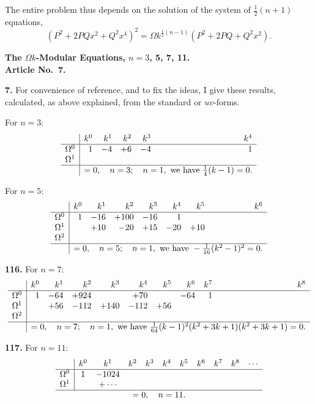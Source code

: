 \documentclass[11pt,a4paper]{article}
\theoremstyle{plain}
\begin{document}
The entire problem thus depends on the solution of the system of $\frac{1}{2}(n + 1)$ equations,
\[
(P^2 + 2PQx^2 + Q^2x^4)^2 = \Omega k^{\frac{1}{2}(n - 1)}(P^2 + 2PQ + Q^2x^2).
\]

\medskip
\noindent\textbf{The $\Omega k$-Modular Equations, $n = 3$, 5, 7, 11.}\\
\textbf{Article No.~7.}

\medskip
\noindent\textbf{7.} For convenience of reference, and to fix the ideas, I give these results, calculated, as above explained, from the standard or $uv$-forms.

For $n = 3$:
\[
\begin{array}{r|rrrrr}
& k^0 & k^1 & k^2 & k^3 & k^4 \\
\hline
\Omega^0 & 1 & -4 & +6 & -4 & 1 \\
\Omega^1 & & & & & \\
\hline
& \multicolumn{5}{c}{= 0, \quad n = 3; \quad n = 1, \text{ we have } \tfrac{1}{4}(k - 1) = 0.}
\end{array}
\]

For $n = 5$:
\[
\begin{array}{r|rrrrrrr}
& k^0 & k^1 & k^2 & k^3 & k^4 & k^5 & k^6 \\
\hline
\Omega^0 & 1 & -16 & +100 & -16 & 1 & & \\
\Omega^1 & & +10 & -20 & +15 & -20 & +10 & \\
\Omega^2 & & & & & & & \\
\hline
& \multicolumn{7}{c}{= 0, \quad n = 5; \quad n = 1, \text{ we have } -\tfrac{1}{16}(k^2 - 1)^2 = 0.}
\end{array}
\]

\medskip
\noindent\textbf{116.} For $n = 7$:
\[
\begin{array}{r|rrrrrrrrr}
& k^0 & k^1 & k^2 & k^3 & k^4 & k^5 & k^6 & k^7 & k^8 \\
\hline
\Omega^0 & 1 & -64 & +924 & & +70 & & -64 & 1 \\
\Omega^1 & & +56 & -112 & +140 & -112 & +56 & & \\
\Omega^2 & & & & & & & & & \\
\hline
& \multicolumn{9}{l}{= 0, \quad n = 7; \quad n = 1, \text{ we have } \tfrac{1}{64}(k - 1)^2(k^2 + 3k + 1)(k^2 + 3k + 1) = 0.}
\end{array}
\]

\medskip
\noindent\textbf{117.} For $n = 11$:
\[
\begin{array}{r|cccccccccc}
& k^0 & k^1 & k^2 & k^3 & k^4 & k^5 & k^6 & k^7 & k^8 & \cdots \\
\hline
\Omega^0 & 1 & -1024 & & & & & & & & \\
\Omega^1 & & +\cdots & & & & & & & & \\
\hline
\multicolumn{11}{c}{= 0, \quad n = 11.}
\end{array}
\]
\end{document}
